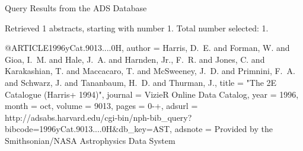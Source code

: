 Query Results from the ADS Database


Retrieved 1 abstracts, starting with number 1.  Total number selected: 1.

@ARTICLE{1996yCat.9013....0H,
   author = {{Harris}, D.~E. and {Forman}, W. and {Gioa}, I.~M. and {Hale}, J.~A. and 
	{Harnden}, Jr., F.~R. and {Jones}, C. and {Karakashian}, T. and 
	{Maccacaro}, T. and {McSweeney}, J.~D. and {Primnini}, F.~A. and 
	{Schwarz}, J. and {Tananbaum}, H.~D. and {Thurman}, J.},
    title = "{The 2E Catalogue (Harris+ 1994)}",
  journal = {VizieR Online Data Catalog},
     year = 1996,
    month = oct,
   volume = 9013,
    pages = {0-+},
   adsurl = {http://adsabs.harvard.edu/cgi-bin/nph-bib_query?bibcode=1996yCat.9013....0H&db_key=AST},
  adsnote = {Provided by the Smithsonian/NASA Astrophysics Data System}
}


